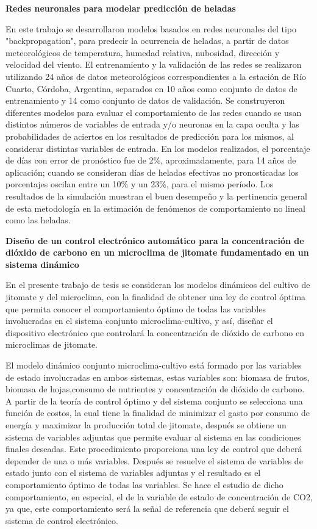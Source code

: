 
\textbf{Redes neuronales para modelar predicción de heladas}
\cite{ovando2005redes} 
\par En este trabajo se desarrollaron modelos basados en redes neuronales del
tipo "backpropagation", para predecir la ocurrencia de heladas, a partir de
datos meteorológicos de temperatura, humedad relativa, nubosidad, dirección y
velocidad del viento. El entrenamiento y la validación de las redes se
realizaron utilizando 24 años de datos meteorológicos correspondientes a la
estación de Río Cuarto, Córdoba, Argentina, separados en 10 años como conjunto
de datos de entrenamiento y 14 como conjunto de datos de validación. Se
construyeron diferentes modelos para evaluar el comportamiento de las redes
cuando se usan distintos números de variables de entrada y/o neuronas en la
capa oculta y las probabilidades de aciertos en los resultados de predicción
para los mismos, al considerar distintas variables de entrada. En los modelos
realizados, el porcentaje de días con error de pronóstico fue de 2\%,
aproximadamente, para 14 años de aplicación; cuando se consideran días de
heladas efectivas no pronosticadas los porcentajes oscilan entre un 10\% y un
23\%, para el mismo período. Los resultados de la simulación muestran el buen
desempeño y la pertinencia general de esta metodología en la estimación de
fenómenos de comportamiento no lineal como las heladas.

\par\textbf{Diseño de un control electrónico automático para la concentración
de dióxido de carbono en un microclima de jitomate fundamentado en un sistema
dinámico}
\cite{ponce2015diseno} 
\par En el presente trabajo de tesis se consideran los modelos dinámicos del
cultivo de jitomate y del microclima, con la finalidad de obtener una ley de
control óptima que permita conocer el comportamiento óptimo de todas las
variables involucradas en el sistema conjunto microclima-cultivo, y así,
diseñar el dispositivo electrónico que controlará la concentración de dióxido
de carbono en microclimas de jitomate.  \par El modelo dinámico conjunto
microclima-cultivo está formado por las variables de estado involucradas en
ambos sistemas, estas variables son: biomasa de frutos, biomasa de
hojas,consumo de nutrientes y concentración de dióxido de carbono. A partir de
la teoría de control óptimo y del sistema conjunto se selecciona una función de
costos, la cual tiene la finalidad de minimizar el gasto por consumo de energía
y maximizar la producción total de jitomate, después se obtiene un sistema de
variables adjuntas que permite evaluar al sistema en las condiciones finales
deseadas. Este procedimiento proporciona una ley de control que deberá depender
de una o más variables.  Después se resuelve el sistema de variables de estado
junto con el sistema de variables adjuntas y el resultado es el comportamiento
óptimo de todas las variables. Se hace el estudio de dicho comportamiento, en
especial, el de la variable de estado de concentración de CO2, ya que, este
comportamiento será la señal de referencia que deberá seguir el sistema de
control electrónico.

